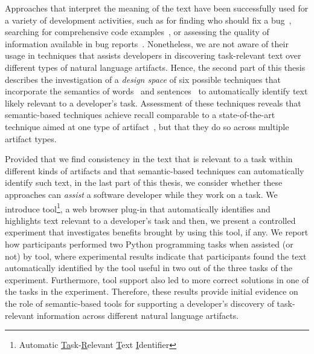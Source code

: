 Approaches that interpret the meaning of the text have been successfully used for a variety of development activities,
such as for finding who should fix a bug~\cite{yang2016}, searching for comprehensive code examples~\cite{silva2019}, or assessing the quality of information available in bug reports~\cite{chaparro2019}.
Nonetheless, we are not aware of their usage in techniques 
that assists developers in discovering task-relevant text over different types of natural language artifacts.
Hence, the second part of this thesis describes 
the investigation of a \textit{design space}
of six possible techniques that incorporate the semantics of words~\cite{Mikolov2013, Devlin2018Bert}
and sentences~\cite{fillmore1976frame, marques2021}
to automatically identify text likely relevant to a developer's task.
Assessment of these techniques reveals that semantic-based techniques
achieve recall comparable to a state-of-the-art technique aimed at one type of artifact~\cite{Xu2017}, but 
that they do so across
multiple artifact types.








Provided that we find consistency in the text  that is relevant to a task within different kinds of artifacts and that semantic-based techniques can automatically identify such text, in the last part of this thesis, 
we consider whether these approaches can \textit{assist} a software developer while they work on a task.
We introduce \acs{tool}\footnote{
    Automatic \underline{Ta}sk-\underline{R}elevant \underline{T}ext \underline{I}dentifier
}, a web browser plug-in that 
automatically identifies and highlights text relevant to a developer's task 
and then, we present a controlled experiment that investigates benefits brought by using this tool, if any.
We report how  participants 
performed two Python programming tasks when 
 assisted (or not) by \acs{tool},
where experimental results indicate that participants found the text automatically identified
by the tool 
useful in two out of the three tasks of the experiment.
Furthermore, tool support also led to more correct solutions 
in one of the tasks in the experiment. Therefore, these results provide
initial evidence on the role of semantic-based tools 
for supporting a developer's discovery of task-relevant information
across different natural language artifacts.



